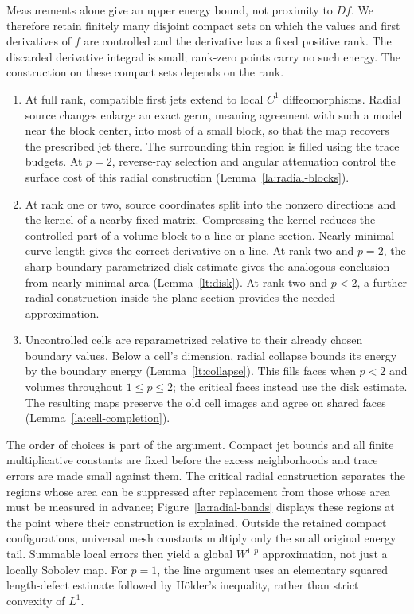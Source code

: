 \documentclass[11pt]{article}
\numberwithin{equation}{section}
\theoremstyle{definition}
\theoremstyle{remark}
\begin{document}
Measurements alone give an upper energy bound, not proximity to
$Df$. We therefore retain finitely many disjoint compact sets on
which the values and first derivatives of $f$ are controlled and
the derivative has a fixed positive rank. The discarded derivative
integral is small; rank-zero points carry no such energy. The
construction on these compact sets depends on the rank.
\begin{enumerate}
\item At full rank, compatible first jets extend to local
$C^1$ diffeomorphisms. Radial source changes enlarge an exact germ,
meaning agreement with such a model near the block center, into most
of a small block, so that the map recovers the prescribed
jet there. The surrounding thin region is filled using the trace
budgets. At $p=2$, reverse-ray selection and angular attenuation
control the surface cost of this radial construction
(Lemma~\ref{la:radial-blocks}).
\item At rank one or two, source coordinates split into the
nonzero directions and the kernel of a nearby fixed matrix.
Compressing the kernel reduces the controlled part of a volume block
to a line or plane section. Nearly minimal curve length gives the
correct derivative on a line. At rank two and $p=2$, the sharp
boundary-parametrized disk estimate gives the analogous conclusion
from nearly minimal area (Lemma~\ref{lt:disk}). At rank two and
$p<2$, a further radial construction inside the plane section
provides the needed approximation.
\item Uncontrolled cells are reparametrized relative to their
already chosen boundary values. Below a cell's dimension, radial
collapse bounds its energy by the boundary energy
(Lemma~\ref{lt:collapse}). This fills faces when $p<2$ and volumes
throughout $1\le p\le2$; the critical faces instead use the disk
estimate. The resulting maps preserve the old cell images and
agree on shared faces (Lemma~\ref{la:cell-completion}).
\end{enumerate}

The order of choices is part of the argument. Compact jet bounds and
all finite multiplicative constants are fixed before the excess
neighborhoods and trace errors are made small against them. The
critical radial construction separates the regions whose area can
be suppressed after replacement from those whose area must be measured
in advance; Figure~\ref{la:radial-bands} displays these regions at the
point where their construction is explained. Outside the
retained compact configurations, universal mesh constants multiply
only the small original energy tail. Summable local errors then
yield a global $W^{1,p}$ approximation, not just a locally Sobolev
map. For $p=1$, the line argument uses an elementary squared
length-defect estimate followed by H\"older's inequality, rather
than strict convexity of $L^1$.
\end{document}

